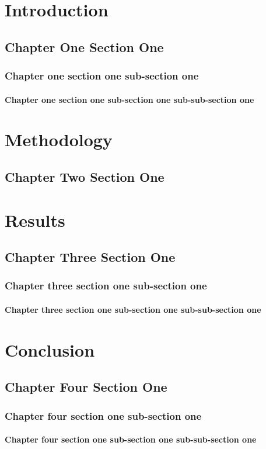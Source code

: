 \chapter{Introduction}
\section{Chapter One Section One}
\subsection{Chapter one section one sub-section one}
\subsubsection{Chapter one section one sub-section one sub-sub-section one}

\chapter{Methodology}
\section{Chapter Two Section One}

\chapter{Results}
\section{Chapter Three Section One}
\subsection{Chapter three section one sub-section one}
\subsubsection{Chapter three section one sub-section one sub-sub-section one}


\chapter{Conclusion}
\section{Chapter Four Section One}
\subsection{Chapter four section one sub-section one}
\subsubsection{Chapter four section one sub-section one sub-sub-section one}


